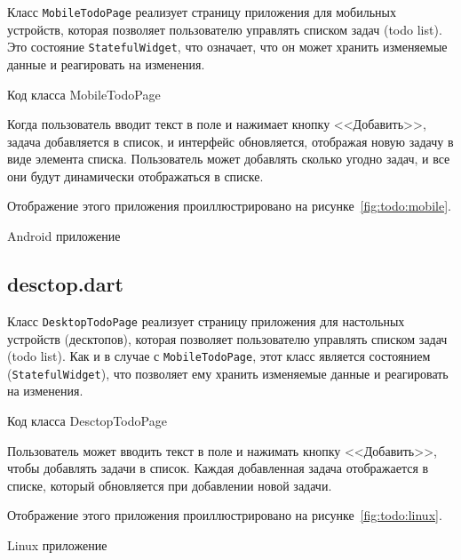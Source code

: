 Класс \texttt{MobileTodoPage}  реализует
страницу приложения для мобильных устройств,
которая позволяет пользователю управлять списком задач (todo list).
Это состояние \texttt{StatefulWidget}, что означает,
что он может хранить изменяемые данные и реагировать на изменения.

\begin{image}
	\caption{Код класса MobileTodoPage}
	\label{fig:lst:todo:mobile}
\end{image}

Когда пользователь вводит текст в поле и нажимает кнопку <<Добавить>>,
задача добавляется в список, и интерфейс обновляется,
отображая новую задачу в виде элемента списка.
Пользователь может добавлять сколько угодно задач,
и все они будут динамически отображаться в списке.

Отображение этого приложения проиллюстрировано
на рисунке~\ref{fig:todo:mobile}.

\begin{image}
	\caption{Android приложение}
	\label{fig:todo:mobile}
\end{image}

\subsection{desctop.dart}

Класс \texttt{DesktopTodoPage} 
реализует страницу приложения для настольных устройств (десктопов),
которая позволяет пользователю управлять списком задач (todo list).
Как и в случае с \texttt{MobileTodoPage}, этот класс является состоянием
(\texttt{StatefulWidget}), что позволяет ему хранить изменяемые данные
и реагировать на изменения.

\begin{image}
	\caption{Код класса DesctopTodoPage}
	\label{fig:lst:todo:desctop}
\end{image}

Пользователь может вводить текст в поле и нажимать кнопку <<Добавить>>,
чтобы добавлять задачи в список.
Каждая добавленная задача отображается в списке,
который обновляется при добавлении новой задачи.

Отображение этого приложения проиллюстрировано
на рисунке~\ref{fig:todo:linux}.

\begin{image}
	\caption{Linux приложение}
	\label{fig:todo:linux}
\end{image}

